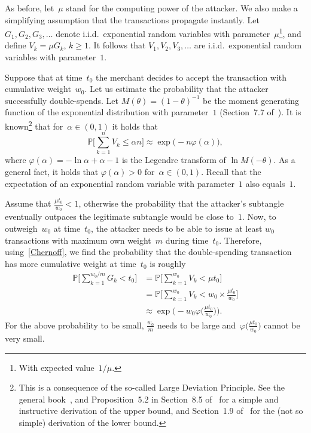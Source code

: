 \documentclass[12pt]{article}
\newcommand{\IP}{\mathbb{P}}
\let\phi=\varphi
\begin{document}
As before, let~$\mu$ stand for the computing power of the attacker.
We also make a simplifying assumption that the 
transactions propagate instantly.
Let $G_1,G_2, G_3,\ldots$ denote i.i.d.\ exponential 
random variables with parameter~$\mu$\footnote{With expected
 value~$1/\mu$.}, and define
$V_k=\mu G_k$, $k\geq 1$. It follows that
$V_1,V_2, V_3,\ldots$ are i.i.d.\ exponential 
random variables with parameter~$1$. 

Suppose that at time~$t_0$ the merchant decides to accept
the transaction with cumulative weight~$w_0$.
Let us estimate the probability that the attacker
successfully double-spends. Let $M(\theta)=(1-\theta)^{-1}$
be the moment generating function of the exponential
distribution with parameter~$1$ (Section~7.7
of~\cite{Ross}). 
It is known\footnote{This is a consequence of the so-called
Large Deviation Principle.
See the general book~\cite{DZ}, and
 Proposition~5.2 in Section~8.5 of~\cite{Ross}
for a simple and instructive derivation of the 
upper bound, and Section~1.9 of~\cite{Dur} for the 
(not so simple) derivation of the lower bound.} that for~$\alpha\in (0,1)$ it holds that
\begin{equation}
\label{Chernoff}
 \IP\Big[\sum_{k=1}^n V_k \leq \alpha n\Big] \approx
   \exp\big(-n\phi(\alpha)\big), 
\end{equation}
where $\phi(\alpha)=-\ln \alpha + \alpha -1$ is the Legendre
transform of $\ln M(-\theta)$. 
As a general fact,
it holds that $\phi(\alpha)>0$ for~$\alpha\in (0,1)$. Recall
that the expectation of an exponential random variable 
with parameter~$1$ also equals~$1$.

Assume that $\frac{\mu t_0}{w_0}<1$, otherwise the probability
that the attacker's subtangle
eventually outpaces the legitimate subtangle would be close to~$1$.
Now, to outweigh~$w_0$ at time~$t_0$, the attacker needs
to be able to issue at least $w_0$ 
transactions with maximum own weight~$m$
during time~$t_0$. 
Therefore, using~\eqref{Chernoff}, we find
 the probability that the double-spending transaction
has more cumulative weight at time~$t_0$
is roughly
\begin{align}
 \IP\Big[\sum_{k=1}^{w_0/m} G_k  < t_0\Big]
 & = \IP\Big[\sum_{k=1}^{w_0} V_k  < \mu t_0\Big]
\nonumber\\
& = \IP\Big[\sum_{k=1}^{w_0} V_k  < w_0
\times\frac{\mu t_0}{w_0}\Big]
\nonumber\\
 & \approx \exp\big(-w_0
\phi\big(\textstyle\frac{\mu t_0}{w_0}\big)\big).
\label{double_t0}
\end{align}
For the above probability to be small,
$\frac{w_0}{m}$ needs to be large 
and~$\phi\big(\textstyle\frac{\mu t_0}{w_0}\big)$
cannot be very small. 
\end{document}
